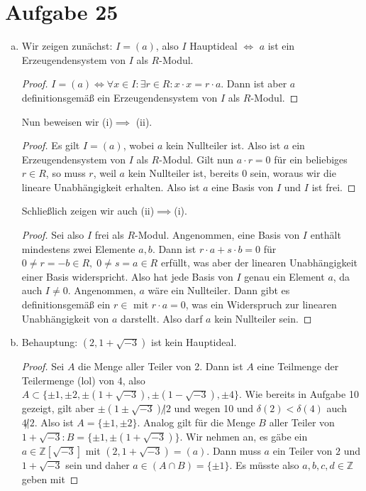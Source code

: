 \documentclass{article}
\theoremstyle{definition}
\newcommand{\Z}{\mathbb{Z}}
\begin{document}
\section*{Aufgabe 25}
\begin{enumerate}[(a)]
    \item Wir zeigen zunächst: $I = (a)$, also $I$ Hauptideal $\Leftrightarrow$ $a$ ist ein Erzeugendensystem von $I$ als $R$-Modul.
    \begin{proof}
        $I = (a) \Leftrightarrow \forall x \in I\colon \exists r \in R\colon x \cdot x = r \cdot a$. Dann ist aber $a$ definitionsgemäß ein Erzeugendensystem von $I$ als $R$-Modul.
    \end{proof}
    Nun beweisen wir (i)$\implies$ (ii).
    \begin{proof}
        Es gilt $I = (a)$, wobei $a$ kein Nullteiler ist. Also ist $a$ ein Erzeugendensystem von $I$ als $R$-Modul. Gilt nun $a \cdot r = 0$ für ein beliebiges $r\in R$, so muss $r$, weil $a$ kein Nullteiler ist, bereits 0 sein, woraus wir die lineare Unabhängigkeit erhalten. Also ist $a$ eine Basis von $I$ und $I$ ist frei.
    \end{proof}
    Schließlich zeigen wir auch (ii)$\implies$(i).
    \begin{proof}
        Sei also $I$ frei als $R$-Modul. Angenommen, eine Basis von $I$ enthält mindestens zwei Elemente $a,b$. Dann ist $r \cdot a + s \cdot b = 0$ für $0 \neq r = -b \in R,\; 0\neq s = a \in R$ erfüllt, was aber der linearen Unabhängigkeit einer Basis widerspricht. Also hat jede Basis von $I$ genau ein Element $a$, da auch $I \neq 0$. Angenommen, $a$ wäre ein Nullteiler. Dann gibt es definitionsgemäß ein $r\in $ mit $r \cdot a = 0$, was ein Widerspruch zur linearen Unabhängigkeit von $a$ darstellt. Also darf $a$ kein Nullteiler sein.
    \end{proof}
    \item Behauptung: $(2,1 + \sqrt{-3})$ ist kein Hauptideal.
    \begin{proof}
        Sei $A$ die Menge aller Teiler von 2. Dann ist $A$ eine Teilmenge der Teilermenge (lol) von 4, also $A \subset \{\pm 1, \pm 2, \pm (1 + \sqrt{-3}), \pm (1 - \sqrt{-3}), \pm 4\}$. Wie bereits in Aufgabe 10 gezeigt, gilt aber $\pm (1 \pm \sqrt{-3}) \not | 2$ und wegen 10 und $\delta(2) < \delta(4)$ auch $4 \not | 2$. Also ist $A = \{\pm 1, \pm 2\}$. Analog gilt für die Menge $B$ aller Teiler von $1 + \sqrt{-3}\colon B = \{\pm 1, \pm (1 + \sqrt{-3})\}$.
        Wir nehmen an, es gäbe ein $a \in \Z[\sqrt{-3}]$ mit $(2,1 + \sqrt{-3}) = (a)$. Dann muss $a$ ein Teiler von $2$ und $1 + \sqrt{-3}$ sein und daher $a \in (A \cap B) = \{\pm 1\}$. Es müsste also $a,b,c,d \in \Z$ geben mit

\end{proof}
\end{enumerate}
\end{document}
